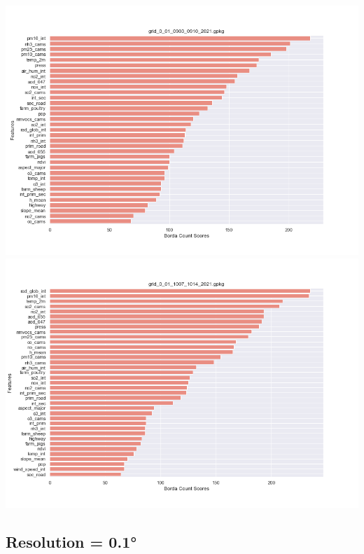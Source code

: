\begin{center}
\includegraphics[width=.9\textwidth]{images/fs_results/pm25/001/no_montains/grid_0_01_0903_0910_2021.png}
\includegraphics[width=.9\textwidth]{images/fs_results/pm25/001/no_montains/grid_0_01_1007_1014_2021.png}
\end{center}
\subsection{Resolution = 0.1°}
